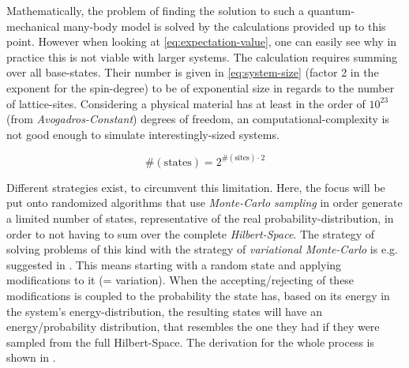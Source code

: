 Mathematically, the problem of finding the solution to such a quantum-mechanical many-body model is solved by the calculations provided up to this point. 
However when looking at \autoref{eq:expectation-value}, one can easily see why in practice this is not viable with larger systems. 
The calculation requires summing over all base-states. 
Their number is given in \autoref{eq:system-size} (factor 2 in the exponent for the spin-degree) to be of exponential size in regards to the number of lattice-sites.
Considering a physical material has at least in the order of $10^{23}$ (from \emph{Avogadros-Constant}) degrees of freedom, an  computational-complexity is not good enough to simulate interestingly-sized systems. 

\begin{equation}
    \label{eq:system-size}
    \text{\#}(\text{states}) = 2^{\text{\#}(\text{sites}) \cdot 2}
\end{equation}

Different strategies exist, to circumvent this limitation.
Here, the focus will be put onto randomized algorithms that use \emph{Monte-Carlo sampling} in order generate a limited number of states, representative of the real probability-distribution, in order to not having to sum over the complete \emph{Hilbert-Space}.
The strategy of solving problems of this kind with the strategy of \emph{variational Monte-Carlo} is e.g. suggested in \cite{metropolisAlgorithmAndVariationalMonteCarlo}.
This means starting with a random state and applying modifications to it (= variation).
When the accepting/rejecting of these modifications is coupled to the probability the state has, based on its energy in the system's energy-distribution, the resulting states will have an energy/probability distribution, that resembles the one they had if they were sampled from the full Hilbert-Space.
The derivation for the whole process is shown in \cite{monteCarloObservableSampling}.

